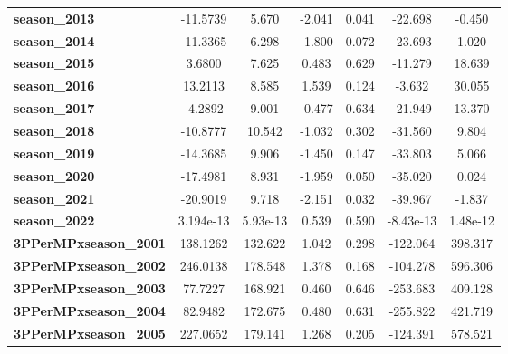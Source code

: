 \begin{center}
\begin{tabular}{lcccccc}
\textbf{season\_2013}         &     -11.5739  &        5.670     &    -2.041  &         0.041        &      -22.698    &       -0.450     \\
\textbf{season\_2014}         &     -11.3365  &        6.298     &    -1.800  &         0.072        &      -23.693    &        1.020     \\
\textbf{season\_2015}         &       3.6800  &        7.625     &     0.483  &         0.629        &      -11.279    &       18.639     \\
\textbf{season\_2016}         &      13.2113  &        8.585     &     1.539  &         0.124        &       -3.632    &       30.055     \\
\textbf{season\_2017}         &      -4.2892  &        9.001     &    -0.477  &         0.634        &      -21.949    &       13.370     \\
\textbf{season\_2018}         &     -10.8777  &       10.542     &    -1.032  &         0.302        &      -31.560    &        9.804     \\
\textbf{season\_2019}         &     -14.3685  &        9.906     &    -1.450  &         0.147        &      -33.803    &        5.066     \\
\textbf{season\_2020}         &     -17.4981  &        8.931     &    -1.959  &         0.050        &      -35.020    &        0.024     \\
\textbf{season\_2021}         &     -20.9019  &        9.718     &    -2.151  &         0.032        &      -39.967    &       -1.837     \\
\textbf{season\_2022}         &    3.194e-13  &     5.93e-13     &     0.539  &         0.590        &    -8.43e-13    &     1.48e-12     \\
\textbf{3PPerMPxseason\_2001} &     138.1262  &      132.622     &     1.042  &         0.298        &     -122.064    &      398.317     \\
\textbf{3PPerMPxseason\_2002} &     246.0138  &      178.548     &     1.378  &         0.168        &     -104.278    &      596.306     \\
\textbf{3PPerMPxseason\_2003} &      77.7227  &      168.921     &     0.460  &         0.646        &     -253.683    &      409.128     \\
\textbf{3PPerMPxseason\_2004} &      82.9482  &      172.675     &     0.480  &         0.631        &     -255.822    &      421.719     \\
\textbf{3PPerMPxseason\_2005} &     227.0652  &      179.141     &     1.268  &         0.205        &     -124.391    &      578.521     \\

\end{tabular}
\end{center}
